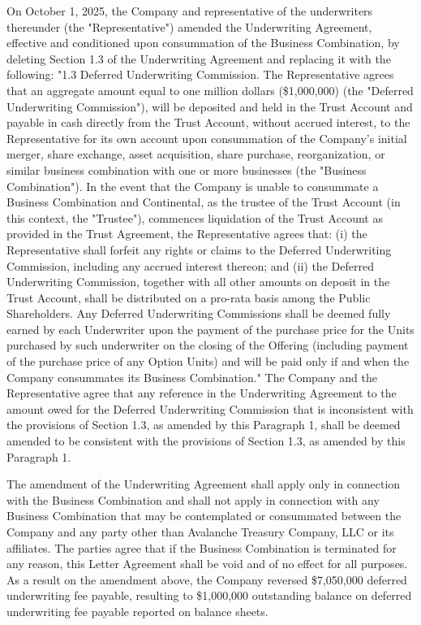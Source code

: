 \documentclass[11pt,a4paper]{article}
\begin{document}
On October 1, 2025, the Company and representative of the underwriters thereunder (the "Representative") amended the Underwriting Agreement, effective and conditioned upon consummation of the Business Combination, by deleting Section 1.3 of the Underwriting Agreement and replacing it with the following: "1.3 Deferred Underwriting Commission. The Representative agrees that an aggregate amount equal to one million dollars (\$1,000,000) (the "Deferred Underwriting Commission"), will be deposited and held in the Trust Account and payable in cash directly from the Trust Account, without accrued interest, to the Representative for its own account upon consummation of the Company's initial merger, share exchange, asset acquisition, share purchase, reorganization, or similar business combination with one or more businesses (the "Business Combination"). In the event that the Company is unable to consummate a Business Combination and Continental, as the trustee of the Trust Account (in this context, the "Trustee"), commences liquidation of the Trust Account as provided in the Trust Agreement, the Representative agrees that: (i) the Representative shall forfeit any rights or claims to the Deferred Underwriting Commission, including any accrued interest thereon; and (ii) the Deferred Underwriting Commission, together with all other amounts on deposit in the Trust Account, shall be distributed on a pro-rata basis among the Public Shareholders. Any Deferred Underwriting Commissions shall be deemed fully earned by each Underwriter upon the payment of the purchase price for the Units purchased by such underwriter on the closing of the Offering (including payment of the purchase price of any Option Units) and will be paid only if and when the Company consummates its Business Combination." The Company and the Representative agree that any reference in the Underwriting Agreement to the amount owed for the Deferred Underwriting Commission that is inconsistent with the provisions of Section 1.3, as amended by this Paragraph 1, shall be deemed amended to be consistent with the provisions of Section 1.3, as amended by this Paragraph 1.

The amendment of the Underwriting Agreement shall apply only in connection with the Business Combination and shall not apply in connection with any Business Combination that may be contemplated or consummated between the Company and any party other than Avalanche Treasury Company, LLC or its affiliates. The parties agree that if the Business Combination is terminated for any reason, this Letter Agreement shall be void and of no effect for all purposes. As a result on the amendment above, the Company reversed \$7,050,000 deferred underwriting fee payable, resulting to \$1,000,000 outstanding balance on deferred underwriting fee payable reported on balance sheets.
\end{document}
